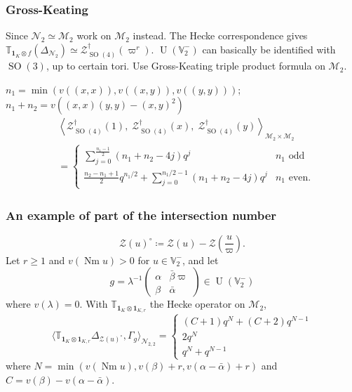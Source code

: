 \documentclass[11pt]{beamer}
\DeclareMathOperator{\Nm}{Nm}
\DeclareMathOperator{\SO}{SO}
\DeclareMathOperator{\U}{U}
\newcommand{\MM}{\mathcal{M}}
\newcommand{\VV}{\mathbb{V}}
\newcommand{\TT}{\mathbb{T}}
\newcommand{\RZ}{\mathcal{N}}
\newcommand{\ZD}{\mathcal{Z}}
\newcommand{\ZO}[1]{\mathcal Z^{\dagger}_{\SO(#1)}}
\begin{document}
\begin{frame}
  \frametitle{Gross-Keating}
  \begin{itemize}
    \ii Since $\RZ_2 \simeq \MM_2$ work on $\MM_2$ instead.
    \ii The Hecke correspondence gives $\TT_{\mathbf{1}_K \otimes f}(\Delta_{\RZ_2}) \simeq \ZO4(\varpi^r)$.
    \ii $\U(\VV_2^-)$ can basically be identified with $\SO(3)$, up to certain tori.
    \ii Use Gross-Keating triple product formula on $\MM_2$.
  \end{itemize}
  \begin{theorem}
    \bgroup
    \small
    $n_1 = \min\left( v((x,x) ), v( (x,y) ), v( (y,y) ) \right)$;
    $n_1 + n_2 = v\left( (x,x) (y,y) - (x,y)^2 \right)$
    \egroup
    \begin{align*}
      &\left< \ZO4(1), \; \ZO4(x), \; \ZO4(y) \right>_{\MM_2 \times \MM_2} \\
      &=
      \begin{cases}
        \sum_{j=0}^{\frac{n_1-1}{2}} (n_1+n_2-4j) q^j & n_1 \text{ odd} \\
        \frac{n_2-n_1+1}{2} q^{n_1/2} + \sum_{j=0}^{n_1/2-1} (n_1+n_2-4j) q^j & n_1 \text{ even}.
      \end{cases}
    \end{align*}
  \end{theorem}
\end{frame}

\begin{frame}
  \frametitle{An example of part of the intersection number}
  \[ \ZD(u)^\circ \coloneqq \ZD(u) - \ZD\left( \frac{u}{\varpi} \right). \]
  Let $r \ge 1$ and $v(\Nm u) > 0$ for $u \in \VV_2^-$, and let
  \[ g = \lambda^{-1}
    \begin{pmatrix} \alpha & \bar\beta \varpi \\ \beta & \bar\alpha \end{pmatrix}
    \in \U(\VV_2^-) \]
  where $v(\lambda) = 0$.
  With $\mathbb{T}_{\mathbf{1}_K \otimes \mathbf{1}_{K, r}}$ the Hecke operator on $\MM_2$,
  \[ \Big\langle \mathbb{T}_{\mathbf{1}_K \otimes \mathbf{1}_{K, r}}
    \Delta_{\ZD(u)^\circ}, \Gamma_g \Big\rangle_{\RZ_{2,2}}
    =
    \begin{cases}
      (C+1) q^{N} + (C+2) q^{N-1} \\
      2q^N \\
      q^N + q^{N-1}
    \end{cases}
  \]
  where $N = \min(v(\Nm u), v(\beta) + r, v(\alpha-\bar\alpha) + r)$
  and $C = v(\beta) - v(\alpha - \bar\alpha)$.
\end{frame}
\end{document}

